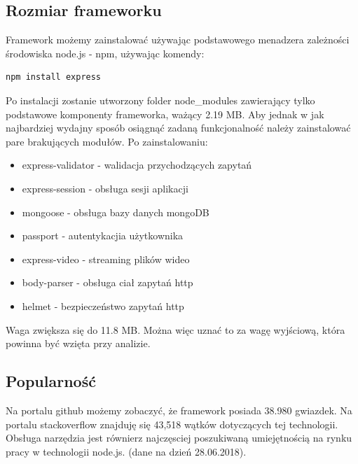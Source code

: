 \documentclass[12pt]{report}
\begin{document}
    \subsection{Rozmiar frameworku}
      Framework możemy zainstalować używając podstawowego menadzera zależności środowiska node.js - npm, używając komendy:
      \begin{lstlisting}[language=bash,numbers=none]
        npm install express
      \end{lstlisting}
      Po instalacji zostanie utworzony folder node\_modules zawierający tylko podstawowe komponenty frameworka, ważący 2.19 MB.
      Aby jednak w jak najbardziej wydajny sposób osiągnąć zadaną funkcjonalność należy zainstalować pare brakujących modułów.
      Po zainstalowaniu:
      \begin{itemize}
        \item express-validator - walidacja przychodzących zapytań
        \item express-session - obsługa sesji aplikacji
        \item mongoose - obsługa bazy danych mongoDB
        \item passport - autentykacjia użytkownika
        \item express-video - streaming plików wideo
        \item body-parser - obsługa ciał zapytań http
        \item helmet - bezpieczeństwo zapytań http
      \end{itemize} 
      Waga zwiększa się do 11.8 MB.
      Można więc uznać to za wagę wyjściową, która powinna być wzięta przy analizie.

    \subsection{Popularność}
      Na portalu github możemy zobaczyć, że framework posiada 38.980 gwiazdek.
      Na portalu stackoverflow znajduję się 43,518 wątków dotyczących tej technologii.
      Obsługa narzędzia jest równierz najczęsciej poszukiwaną umiejętnością na rynku pracy w technologii node.js.
      (dane na dzień 28.06.2018).
\end{document}
